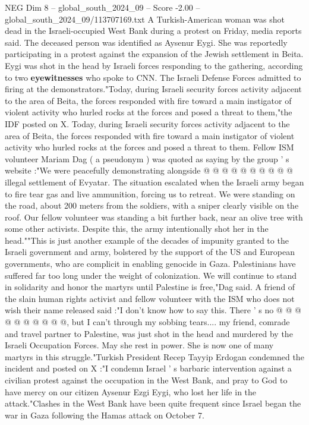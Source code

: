 \begin{textsample}{NEG Dim 8 – global\_south\_2024\_09 – Score -2.00 – global\_south\_2024\_09/113707169.txt}  \label{ex:f8_neg_203}
A Turkish-American woman was shot dead in the Israeli-occupied West Bank during a protest on Friday, media reports said.
The deceased person was identified as Aysenur Eygi.
She was reportedly participating in a protest against the expansion of the Jewish settlement in Beita.
Eygi was shot in the head by Israeli forces responding to the gathering, according to two \textbf{eyewitnesses} who spoke to CNN.
The Israeli Defense Forces admitted to firing at the demonstrators."Today, during Israeli security forces activity adjacent to the area of Beita, the forces responded with fire toward a main instigator of violent activity who hurled rocks at the forces and posed a threat to them,"the IDF posted on X.
Today, during Israeli security forces activity adjacent to the area of Beita, the forces responded with fire toward a main instigator of violent activity who hurled rocks at the forces and posed a threat to them.
Fellow ISM volunteer Mariam Dag ( a pseudonym ) was quoted as saying by the group ' s website :"We were peacefully demonstrating alongside @ @ @ @ @ @ @ @ @ @ illegal settlement of Evyatar.
The situation escalated when the Israeli army began to fire tear gas and live ammunition, forcing us to retreat.
We were standing on the road, about 200 meters from the soldiers, with a sniper clearly visible on the roof.
Our fellow volunteer was standing a bit further back, near an olive tree with some other activists.
Despite this, the army intentionally shot her in the head.""This is just another example of the decades of impunity granted to the Israeli government and army, bolstered by the support of the US and European governments, who are complicit in enabling genocide in Gaza.
Palestinians have suffered far too long under the weight of colonization.
We will continue to stand in solidarity and honor the martyrs until Palestine is free,"Dag said.
A friend of the slain human rights activist and fellow volunteer with the ISM who does not wish their name released said :"I don't know how to say this.
There ' s no @ @ @ @ @ @ @ @ @ @, but I can't through my sobbing tears.... my friend, comrade and travel partner to Palestine, was just shot in the head and murdered by the Israeli Occupation Forces.
May she rest in power.
She is now one of many martyrs in this struggle."Turkish President Recep Tayyip Erdogan condemned the incident and posted on X :"I condemn Israel ' s barbaric intervention against a civilian protest against the occupation in the West Bank, and pray to God to have mercy on our citizen Aysenur Ezgi Eygi, who lost her life in the attack."Clashes in the West Bank have been quite frequent since Israel began the war in Gaza following the Hamas attack on October 7.

\end{textsample}
